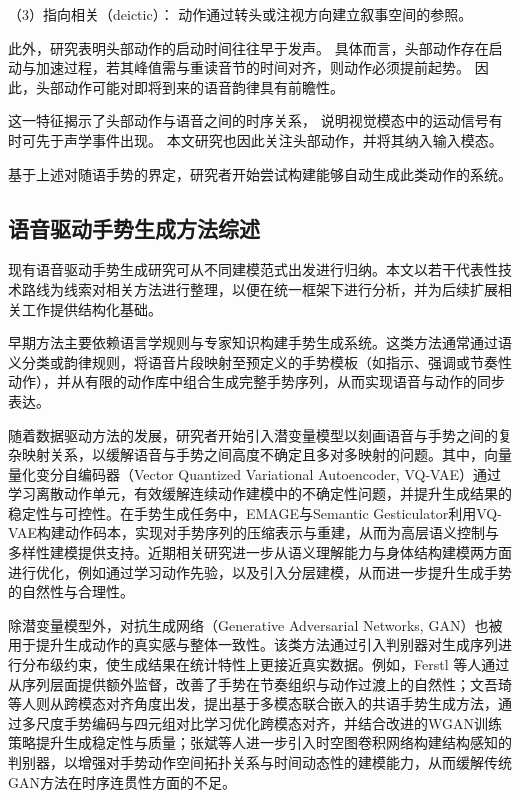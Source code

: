 （3）指向相关（deictic）：
动作通过转头或注视方向建立叙事空间的参照。

此外，研究表明头部动作的启动时间往往早于发声\cite{esteve2017timing}。
具体而言，头部动作存在启动与加速过程，若其峰值需与重读音节的时间对齐，则动作必须提前起势。%
因此，头部动作可能对即将到来的语音韵律具有前瞻性。%

这一特征揭示了头部动作与语音之间的时序关系，%
说明视觉模态中的运动信号有时可先于声学事件出现。%
本文研究也因此关注头部动作，并将其纳入输入模态。

基于上述对随语手势的界定，研究者开始尝试构建能够自动生成此类动作的系统。

\subsection{语音驱动手势生成方法综述}

现有语音驱动手势生成研究可从不同建模范式出发进行归纳。本文以若干代表性技术路线为线索对相关方法进行整理，以便在统一框架下进行分析，并为后续扩展相关工作提供结构化基础。

早期方法主要依赖语言学规则与专家知识构建手势生成系统\cite{behavior_expression_animation_toolkit,robot_behavior_toolkit,gesture_generation_by_imitation}。这类方法通常通过语义分类或韵律规则，将语音片段映射至预定义的手势模板（如指示、强调或节奏性动作），并从有限的动作库中组合生成完整手势序列，从而实现语音与动作的同步表达。

随着数据驱动方法的发展，研究者开始引入潜变量模型以刻画语音与手势之间的复杂映射关系，以缓解语音与手势之间高度不确定且多对多映射的问题。其中，向量量化变分自编码器（Vector Quantized Variational Autoencoder, VQ-VAE）\cite{vqvae}通过学习离散动作单元，有效缓解连续动作建模中的不确定性问题，并提升生成结果的稳定性与可控性。在手势生成任务中，EMAGE\cite{emage}与Semantic Gesticulator\cite{Zhang2024SemanticGesture}利用VQ-VAE构建动作码本，实现对手势序列的压缩表示与重建，从而为高层语义控制与多样性建模提供支持。近期相关研究进一步从语义理解能力与身体结构建模两方面进行优化，例如通过学习动作先验\cite{liu2025semges}，以及引入分层建模\cite{HIP}，从而进一步提升生成手势的自然性与合理性。

除潜变量模型外，对抗生成网络（Generative Adversarial Networks, GAN）\cite{gan2014}也被用于提升生成动作的真实感与整体一致性。该类方法通过引入判别器对生成序列进行分布级约束，使生成结果在统计特性上更接近真实数据。例如，Ferstl 等人通过从序列层面提供额外监督，改善了手势在节奏组织与动作过渡上的自然性\cite{GANsINGesture2020}；文吾琦等人则从跨模态对齐角度出发，提出基于多模态联合嵌入的共语手势生成方法，通过多尺度手势编码与四元组对比学习优化跨模态对齐，并结合改进的WGAN训练策略提升生成稳定性与质量\cite{wen2025multimodal_gesture,wganImproved}；张斌等人进一步引入时空图卷积网络构建结构感知的判别器，以增强对手势动作空间拓扑关系与时间动态性的建模能力，从而缓解传统GAN方法在时序连贯性方面的不足\cite{zhang2022stgcn_gesture}。

